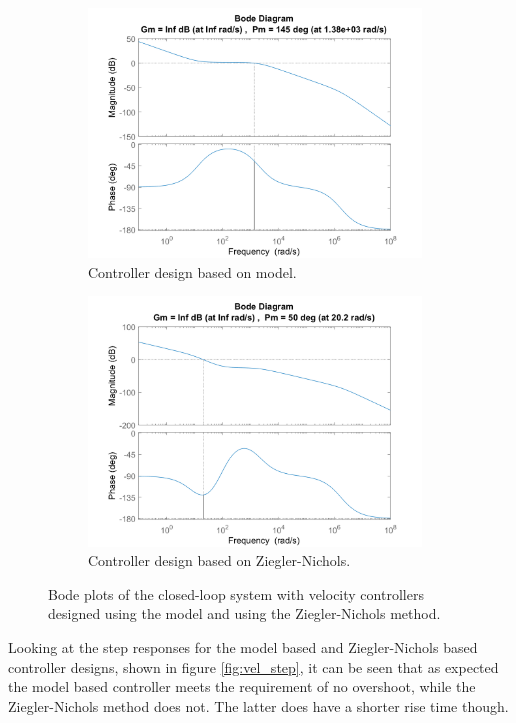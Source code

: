 \documentclass[../../main.tex]{subfiles}
\begin{document}
\begin{figure}[h]
\begin{subfigure}{0.48\textwidth}
    \includegraphics[width = 0.97\textwidth]{Sections/System_Design/Images/SM_TiltMotorVel_polePlace.png}
    \caption{Controller design based on model.}
    \label{fig:vel_PP_stability_plot}
\end{subfigure}\quad
\begin{subfigure}{0.48\textwidth}
    \includegraphics[width = 0.97\textwidth]{Sections/System_Design/Images/SM_TiltMotorVel_NZ.png}
    \caption{Controller design based on Ziegler-Nichols.}
    \label{fig:vel_ZN_stabilty_plot}
\end{subfigure}
\caption{Bode plots of the closed-loop system with velocity controllers designed using the model and using the Ziegler-Nichols method.}
\label{fig:vel_stability_plots}
\end{figure}
Looking at the step responses for the model based and Ziegler-Nichols based controller designs, shown in figure \ref{fig:vel_step}, it can be seen that as expected the model based controller meets the requirement of no overshoot, while the Ziegler-Nichols method does not. The latter does have a shorter rise time though.
\end{document}
